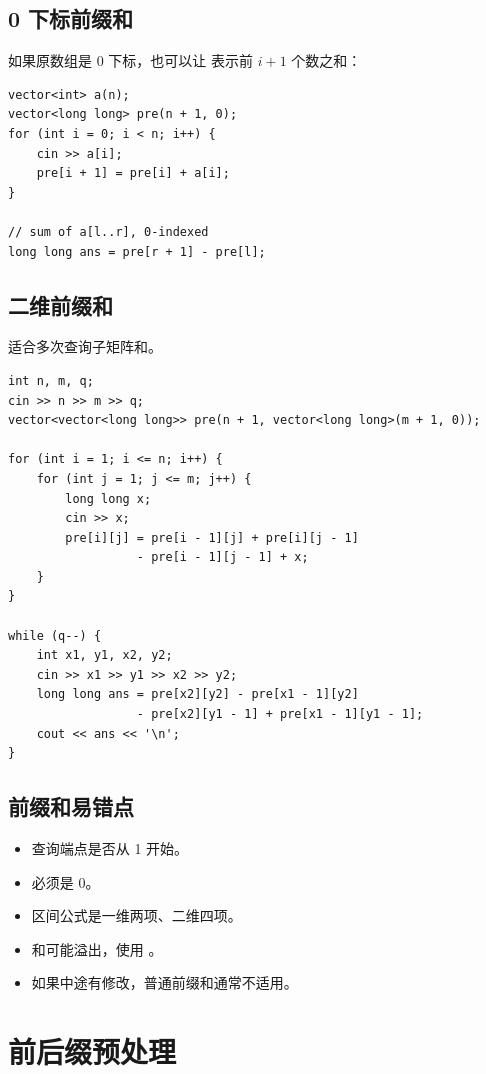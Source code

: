\subsection{0 下标前缀和}

如果原数组是 0 下标，也可以让  表示前 $i+1$ 个数之和：

\begin{lstlisting}
vector<int> a(n);
vector<long long> pre(n + 1, 0);
for (int i = 0; i < n; i++) {
    cin >> a[i];
    pre[i + 1] = pre[i] + a[i];
}

// sum of a[l..r], 0-indexed
long long ans = pre[r + 1] - pre[l];
\end{lstlisting}

\subsection{二维前缀和}

适合多次查询子矩阵和。

\begin{lstlisting}
int n, m, q;
cin >> n >> m >> q;
vector<vector<long long>> pre(n + 1, vector<long long>(m + 1, 0));

for (int i = 1; i <= n; i++) {
    for (int j = 1; j <= m; j++) {
        long long x;
        cin >> x;
        pre[i][j] = pre[i - 1][j] + pre[i][j - 1]
                  - pre[i - 1][j - 1] + x;
    }
}

while (q--) {
    int x1, y1, x2, y2;
    cin >> x1 >> y1 >> x2 >> y2;
    long long ans = pre[x2][y2] - pre[x1 - 1][y2]
                  - pre[x2][y1 - 1] + pre[x1 - 1][y1 - 1];
    cout << ans << '\n';
}
\end{lstlisting}

\subsection{前缀和易错点}

\begin{itemize}
  \item 查询端点是否从 1 开始。
  \item {} 必须是 0。
  \item 区间公式是一维两项、二维四项。
  \item 和可能溢出，使用 。
  \item 如果中途有修改，普通前缀和通常不适用。
\end{itemize}

\section{前后缀预处理}\label{sec:06-8}

